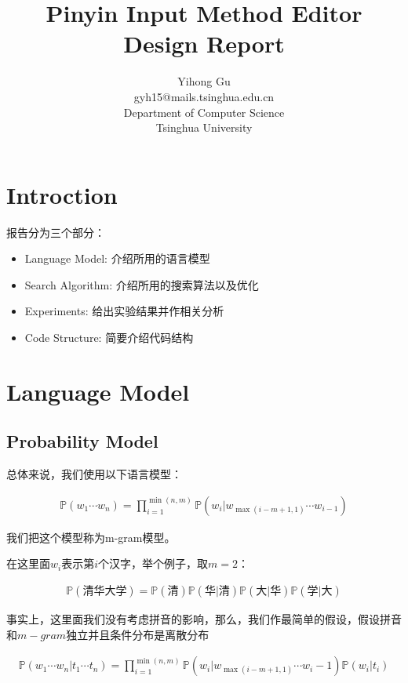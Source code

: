 \documentclass{article}
\title{Pinyin Input Method Editor\\Design Report}
\author{\large Yihong Gu\\gyh15@mails.tsinghua.edu.cn\\Department of Computer Science\\Tsinghua University}
\date{}
\begin{document}
\maketitle

\section{Introction}

报告分为三个部分：

\begin{itemize}
	\item Language Model: 介绍所用的语言模型
	\item Search Algorithm: 介绍所用的搜索算法以及优化
	\item Experiments: 给出实验结果并作相关分析
	\item Code Structure: 简要介绍代码结构
\end{itemize}

\section{Language Model}

\subsection{Probability Model}

总体来说，我们使用以下语言模型：

\begin{eqnarray}
	\mathbb{P}(w_1\cdots w_n) = \prod_{i=1}^{\min(n,m)}{\mathbb{P}(w_i\lvert w_{\max(i-m+1,1)} \cdots w_{i-1})}
\end{eqnarray}

我们把这个模型称为m-gram模型。

在这里面$w_i$表示第$i$个汉字，举个例子，取$m=2$：

\begin{eqnarray}
	\mathbb{P}(\text{清华大学})=\mathbb{P}(\text{清})\mathbb{P}(\text{华}\lvert\text{清})\mathbb{P}(\text{大}\lvert\text{华})\mathbb{P}(\text{学}\lvert\text{大})
\end{eqnarray}

事实上，这里面我们没有考虑拼音的影响，那么，我们作最简单的假设，假设拼音和$m-gram$独立并且条件分布是离散分布

\begin{eqnarray}
	\mathbb{P}(w_1\cdots w_n\lvert t_1 \cdots t_n) = \prod_{i=1}^{\min(n,m)}{\mathbb{P}(w_i\lvert w_{\max(i-m+1,1)} \cdots w_i-1)\mathbb{P}(w_i \lvert t_i)}
\end{eqnarray}
\end{document}
